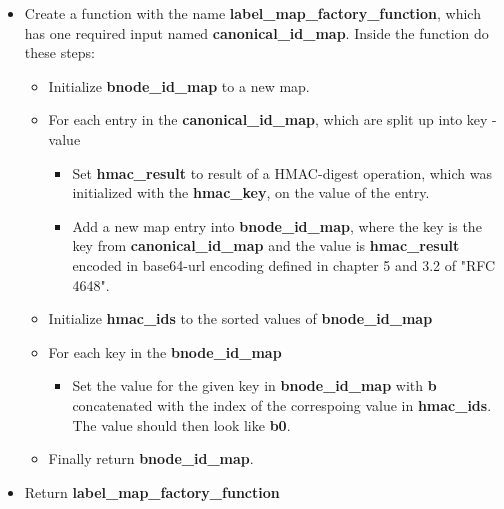 \documentclass[
	a4paper               %
	,bibliography=totoc   %
	,listof=totoc         %
	,monolingual
	twoside=false,
]{bfhthesis}              %
\begin{document}



\begin{itemize}
	\item Create a function with the name \textbf{label\_map\_factory\_function}, which has one required input named \textbf{canonical\_id\_map}. Inside the function do these steps:
	\begin{itemize}
		\item Initialize \textbf{bnode\_id\_map} to a new map.
		\item For each entry in the \textbf{canonical\_id\_map}, which are split up into key - value
		\begin{itemize}
			\item Set \textbf{hmac\_result} to result of a HMAC-digest operation, which was initialized with the \textbf{hmac\_key}, on the value of the entry. 
			\item Add a new map entry into \textbf{bnode\_id\_map}, where the key is the key from \textbf{canonical\_id\_map} and the value is \textbf{hmac\_result} encoded in base64-url encoding defined in chapter 5 and 3.2 of "RFC 4648"\cite{base64}.
		\end{itemize}
		\item Initialize \textbf{hmac\_ids} to the sorted values of \textbf{bnode\_id\_map}
		\item For each key in the \textbf{bnode\_id\_map}
		\begin{itemize}
			\item Set the value for the given key in \textbf{bnode\_id\_map} with \textbf{b} concatenated with the index of the correspoing value in \textbf{hmac\_ids}. The value should then look like \textbf{b0}.
		\end{itemize}
		\item Finally return \textbf{bnode\_id\_map}.
	\end{itemize}
	\item Return \textbf{label\_map\_factory\_function}
\end{itemize}
\end{document}
